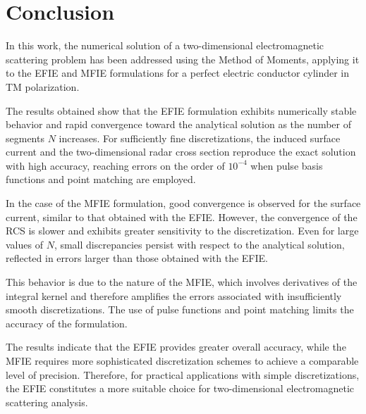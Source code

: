 \documentclass[11pt,a4paper,twoside,pdf]{article}
\numberwithin{equation}{section}
\begin{document}
\newpage





\section{Conclusion}

In this work, the numerical solution of a two-dimensional electromagnetic scattering problem has been addressed using the Method of Moments, applying it to the EFIE and MFIE formulations for a perfect electric conductor cylinder in TM polarization.

The results obtained show that the EFIE formulation exhibits numerically stable behavior and rapid convergence toward the analytical solution as the number of segments $N$ increases. For sufficiently fine discretizations, the induced surface current and the two-dimensional radar cross section reproduce the exact solution with high accuracy, reaching errors on the order of $10^{-4}$ when pulse basis functions and point matching are employed.

In the case of the MFIE formulation, good convergence is observed for the surface current, similar to that obtained with the EFIE. However, the convergence of the RCS is slower and exhibits greater sensitivity to the discretization. Even for large values of $N$, small discrepancies persist with respect to the analytical solution, reflected in errors larger than those obtained with the EFIE.

This behavior is due to the nature of the MFIE, which involves derivatives of the integral kernel and therefore amplifies the errors associated with insufficiently smooth discretizations. The use of pulse functions and point matching limits the accuracy of the formulation.

The results indicate that the EFIE provides greater overall accuracy, while the MFIE requires more sophisticated discretization schemes to achieve a comparable level of precision. Therefore, for practical applications with simple discretizations, the EFIE constitutes a more suitable choice for two-dimensional electromagnetic scattering analysis.



















\newpage



\end{document}
